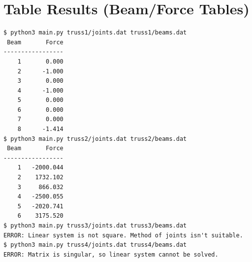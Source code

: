\documentclass[11pt]{amsart}
\theoremstyle{definition}
\begin{document}
\section{Table Results (Beam/Force Tables)}
\begin{Verbatim}[fontsize=\small]
$ python3 main.py truss1/joints.dat truss1/beams.dat
 Beam       Force
-----------------
    1       0.000
    2      -1.000
    3       0.000
    4      -1.000
    5       0.000
    6       0.000
    7       0.000
    8      -1.414
$ python3 main.py truss2/joints.dat truss2/beams.dat
 Beam       Force
-----------------
    1   -2000.044
    2    1732.102
    3     866.032
    4   -2500.055
    5   -2020.741
    6    3175.520
$ python3 main.py truss3/joints.dat truss3/beams.dat
ERROR: Linear system is not square. Method of joints isn't suitable.
$ python3 main.py truss4/joints.dat truss4/beams.dat
ERROR: Matrix is singular, so linear system cannot be solved.
\end{Verbatim}
\end{document}

